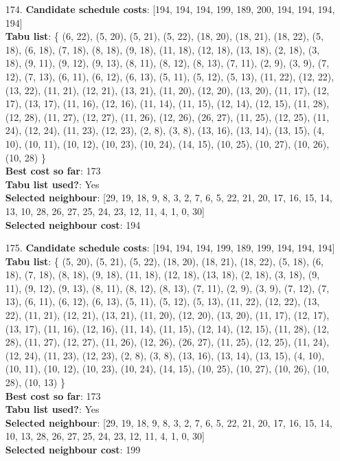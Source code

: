 \documentclass[fleqn]{article}
\begin{document}
\begin{itemize}
    \item[174.] \textbf{Candidate schedule costs}: [194, 194, 194, 199, 189, 200, 194, 194, 194, 194] \\
    \textbf{Tabu list}: \{ (6, 22), (5, 20), (5, 21), (5, 22), (18, 20), (18, 21), (18, 22), (5, 18), (6, 18), (7, 18), (8, 18), (9, 18), (11, 18), (12, 18), (13, 18), (2, 18), (3, 18), (9, 11), (9, 12), (9, 13), (8, 11), (8, 12), (8, 13), (7, 11), (2, 9), (3, 9), (7, 12), (7, 13), (6, 11), (6, 12), (6, 13), (5, 11), (5, 12), (5, 13), (11, 22), (12, 22), (13, 22), (11, 21), (12, 21), (13, 21), (11, 20), (12, 20), (13, 20), (11, 17), (12, 17), (13, 17), (11, 16), (12, 16), (11, 14), (11, 15), (12, 14), (12, 15), (11, 28), (12, 28), (11, 27), (12, 27), (11, 26), (12, 26), (26, 27), (11, 25), (12, 25), (11, 24), (12, 24), (11, 23), (12, 23), (2, 8), (3, 8), (13, 16), (13, 14), (13, 15), (4, 10), (10, 11), (10, 12), (10, 23), (10, 24), (14, 15), (10, 25), (10, 27), (10, 26), (10, 28) \} \\
    \textbf{Best cost so far}: 173 \\
    \textbf{Tabu list used?}: Yes \\
    \textbf{Selected neighbour}: [29, 19, 18, 9, 8, 3, 2, 7, 6, 5, 22, 21, 20, 17, 16, 15, 14, 13, 10, 28, 26, 27, 25, 24, 23, 12, 11, 4, 1, 0, 30] \\
    \textbf{Selected neighbour cost}: 194
      

    \item[175.] \textbf{Candidate schedule costs}: [194, 194, 194, 199, 189, 199, 194, 194, 194] \\
    \textbf{Tabu list}: \{ (5, 20), (5, 21), (5, 22), (18, 20), (18, 21), (18, 22), (5, 18), (6, 18), (7, 18), (8, 18), (9, 18), (11, 18), (12, 18), (13, 18), (2, 18), (3, 18), (9, 11), (9, 12), (9, 13), (8, 11), (8, 12), (8, 13), (7, 11), (2, 9), (3, 9), (7, 12), (7, 13), (6, 11), (6, 12), (6, 13), (5, 11), (5, 12), (5, 13), (11, 22), (12, 22), (13, 22), (11, 21), (12, 21), (13, 21), (11, 20), (12, 20), (13, 20), (11, 17), (12, 17), (13, 17), (11, 16), (12, 16), (11, 14), (11, 15), (12, 14), (12, 15), (11, 28), (12, 28), (11, 27), (12, 27), (11, 26), (12, 26), (26, 27), (11, 25), (12, 25), (11, 24), (12, 24), (11, 23), (12, 23), (2, 8), (3, 8), (13, 16), (13, 14), (13, 15), (4, 10), (10, 11), (10, 12), (10, 23), (10, 24), (14, 15), (10, 25), (10, 27), (10, 26), (10, 28), (10, 13) \} \\
    \textbf{Best cost so far}: 173 \\
    \textbf{Tabu list used?}: Yes \\
    \textbf{Selected neighbour}: [29, 19, 18, 9, 8, 3, 2, 7, 6, 5, 22, 21, 20, 17, 16, 15, 14, 10, 13, 28, 26, 27, 25, 24, 23, 12, 11, 4, 1, 0, 30] \\
    \textbf{Selected neighbour cost}: 199
      


\end{itemize}
\end{document}
